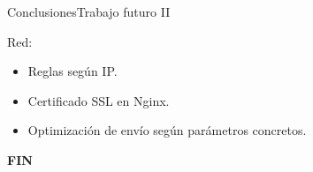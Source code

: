 \begin{frame}{Conclusiones}{Trabajo futuro II}

Red:

\begin{itemize}
    \item Reglas según IP.
    \item Certificado SSL en Nginx.
    \item Optimización de envío según parámetros concretos.
\end{itemize}

\end{frame}

\begin{frame}
    \begin{center}
    {\Huge
    \textbf{FIN}
    }
    \end{center}
\end{frame}

